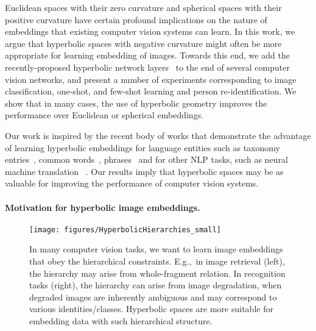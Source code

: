 \documentclass[10pt,twocolumn,letterpaper]{article}
\begin{document}
Euclidean spaces with their zero curvature and spherical spaces with their positive curvature have certain profound implications on the nature of embeddings that existing computer vision systems can learn. In this work, we argue that hyperbolic spaces with negative curvature might often be more appropriate for learning embedding of images. Towards this end, we add the recently-proposed hyperbolic network layers~\cite{ganea2018hyperbolic} to the end of several computer vision networks, and present a number of experiments corresponding to image classification, one-shot, and few-shot learning and person re-identification. We show that in many cases, the use of hyperbolic geometry improves the performance over Euclidean or spherical embeddings. 

Our work is inspired by the recent body of works that demonstrate the advantage of learning hyperbolic embeddings for language entities such as taxonomy entries~\cite{nickel2017poincare}, common words~\cite{tifrea2018poincar}, phrases~\cite{dhingra2018embedding} and for other NLP tasks, such as neural machine translation ~\cite{gulcehre2018hyperbolic}.
Our results imply that hyperbolic spaces may be as valuable for improving the performance of computer vision systems.

\paragraph{Motivation for hyperbolic image embeddings.} 

\begin{figure}[t]
    \centering
    \texttt{[image: figures/HyperbolicHierarchies\_small]}
\caption{In many computer vision tasks, we want to learn image embeddings that obey the hierarchical constraints. E.g.,\ in image retrieval (left), the hierarchy may arise from whole-fragment relation. In  recognition tasks (right), the hierarchy can arise from image degradation, when degraded images are inherently ambiguous and may correspond to various identities/classes. Hyperbolic spaces are more suitable for embedding data with such hierarchical structure. }
    \label{fig:motivation}
    
\end{figure}
\end{document}
